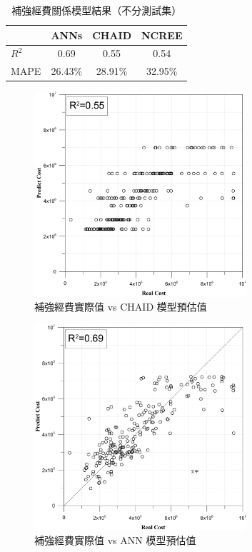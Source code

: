 {\renewcommand{\arraystretch}{1.5}
\begin{table}[hbtp]
  \begin{center}
    \caption{補強經費關係模型結果（不分測試集）}
    \label{tab:cost_result_2}
    \large
    \begin{tabular}{l c c c}
      \hline
       & ANNs & CHAID & NCREE \\
      \hline
     $R^2$ & 0.69 & 0.55 & 0.54 \\
     MAPE & 26.43\% & 28.91\% & 32.95\% \\
      \hline
      \end{tabular}
  \end{center}
\end{table}
}

\begin{figure}[hbtp]
  \begin{center}
    \includegraphics[width=0.7\textwidth]{figures/cob-chaid.pdf}
    \caption{補強經費實際值 vs CHAID 模型預估值} 
    \label{fig:cob-chaid-vs}
  \end{center}
\end{figure}


\begin{figure}[hbtp]
  \begin{center}
    \includegraphics[width=0.7\textwidth]{figures/cob-ann.pdf}
    \caption{補強經費實際值 vs ANN 模型預估值} 
    \label{fig:cob-ann-vs}
  \end{center}
\end{figure}


